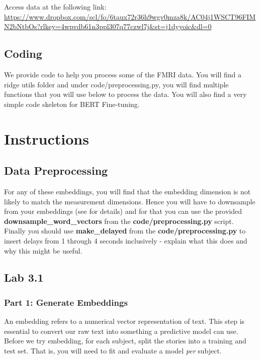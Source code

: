 \documentclass[letterpaper,12pt]{article}
\begin{document}
Access data at the following link: \url{https://www.dropbox.com/scl/fo/6taux72r36h9wgv0mza8k/AC04j1WSCT96FIMN2bNtbOs?rlkey=4wpvdb61n3ppl307q77czwl7j&st=j1dyyoic&dl=0}

\subsection{Coding}
We provide code to help you process some of the FMRI data. You will find a ridge utils folder and under code/preprocessing.py, you will find multiple functions that you will use below to process the data. You will also find a very simple code skeleton for BERT Fine-tuning.

\section{Instructions}

\subsection{Data Preprocessing}
For any of these embeddings, you will find that the embedding dimension is not likely to match the measurement dimensions. Hence you will have to downsample from your embeddings (see \cite{NEURIPS2018_f471223d} for details) and for that you can use the provided \textbf{downsample\_word\_vectors} from the \textbf{code/preprocessing.py} script.\\
Finally you should use \textbf{make\_delayed} from the \textbf{code/preprocessing.py} to insert delays from 1 through 4 seconds inclusively - explain what this does and why this might be useful.

\subsection{Lab 3.1}
\subsubsection{Part 1: Generate Embeddings}
An embedding refers to a numerical vector representation of text. This step is essential to convert our raw text into something a predictive model can use. Before we try embedding, for each subject, split the stories into a training and test set. That is, you will need to fit and evaluate a model \textit{per} subject.
\end{document}

